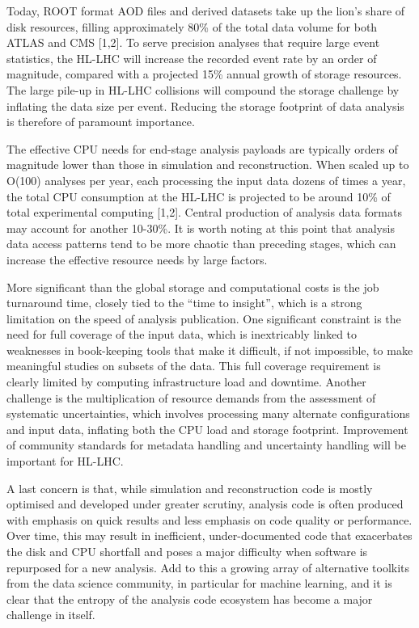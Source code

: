 \documentclass[11pt,a4paper]{article}
\begin{document}
Today, ROOT format AOD files and derived datasets take up the lion's
share of disk resources, filling approximately 80\% of the total data
volume for both ATLAS and CMS {[}1,2{]}. To serve precision analyses
that require large event statistics, the HL-LHC will increase the
recorded event rate by an order of magnitude, compared with a projected
15\% annual growth of storage resources. The large pile-up in HL-LHC
collisions will compound the storage challenge by inflating the data
size per event. Reducing the storage footprint of data analysis is
therefore of paramount importance.

The effective CPU needs for end-stage analysis payloads are typically
orders of magnitude lower than those in simulation and reconstruction.
When scaled up to O(100) analyses per year, each processing the input
data dozens of times a year, the total CPU consumption at the HL-LHC is
projected to be around 10\% of total experimental computing {[}1,2{]}.
Central production of analysis data formats may account for another
10-30\%. It is worth noting at this point that analysis data access
patterns tend to be more chaotic than preceding stages, which can
increase the effective resource needs by large factors.

More significant than the global storage and computational costs is the
job turnaround time, closely tied to the ``time to insight'', which is a
strong limitation on the speed of analysis publication. One significant
constraint is the need for full coverage of the input data, which is
inextricably linked to weaknesses in book-keeping tools that make it
difficult, if not impossible, to make meaningful studies on subsets of
the data. This full coverage requirement is clearly limited by computing
infrastructure load and downtime. Another challenge is the
multiplication of resource demands from the assessment of systematic
uncertainties, which involves processing many alternate configurations
and input data, inflating both the CPU load and storage footprint.
Improvement of community standards for metadata handling and uncertainty
handling will be important for HL-LHC.

A last concern is that, while simulation and reconstruction code is
mostly optimised and developed under greater scrutiny, analysis code is
often produced with emphasis on quick results and less emphasis on code
quality or performance. Over time, this may result in inefficient,
under-documented code that exacerbates the disk and CPU shortfall and
poses a major difficulty when software is repurposed for a new analysis.
Add to this a growing array of alternative toolkits from the data
science community, in particular for machine learning, and it is clear
that the entropy of the analysis code ecosystem has become a major
challenge in itself.
\end{document}
